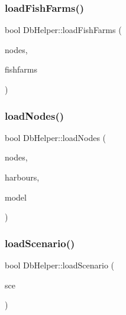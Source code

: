 \mbox{\label{class_db_helper_ade6c4c084b6076cc6d207690c0f47121}} 
\subsubsection{\texorpdfstring{loadFishFarms()}{loadFishFarms()}}
{\footnotesize\ttfamily bool Db\+Helper\+::load\+Fish\+Farms (\begin{DoxyParamCaption}\item[{const Q\+List$<$ std\+::shared\+\_\+ptr$<$ \mbox{\hyperlink{class_node_data}{Node\+Data}} $>$ $>$ \&}]{nodes,  }\item[{Q\+List$<$ std\+::shared\+\_\+ptr$<$ \mbox{\hyperlink{class_fishfarm_data}{Fishfarm\+Data}} $>$$>$ \&}]{fishfarms }\end{DoxyParamCaption})}

\mbox{\label{class_db_helper_a71be4973234a93536184797396dfd3af}} 
\subsubsection{\texorpdfstring{loadNodes()}{loadNodes()}}
{\footnotesize\ttfamily bool Db\+Helper\+::load\+Nodes (\begin{DoxyParamCaption}\item[{Q\+List$<$ std\+::shared\+\_\+ptr$<$ \mbox{\hyperlink{class_node_data}{Node\+Data}} $>$ $>$ \&}]{nodes,  }\item[{Q\+List$<$ std\+::shared\+\_\+ptr$<$ \mbox{\hyperlink{class_harbour_data}{Harbour\+Data}} $>$ $>$ \&}]{harbours,  }\item[{\mbox{\hyperlink{class_displace_model}{Displace\+Model}} $\ast$}]{model }\end{DoxyParamCaption})}

\mbox{\label{class_db_helper_a90de247f0d65d1d6f07806ad12ea17dc}} 
\subsubsection{\texorpdfstring{loadScenario()}{loadScenario()}}
{\footnotesize\ttfamily bool Db\+Helper\+::load\+Scenario (\begin{DoxyParamCaption}\item[{\mbox{\hyperlink{class_scenario}{Scenario}} \&}]{sce }\end{DoxyParamCaption})}

